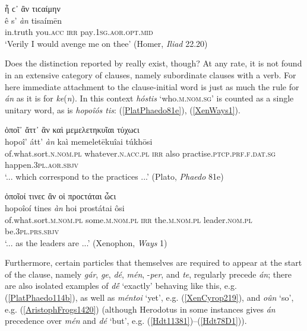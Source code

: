 \begin{exe}
\ex ἦ ϲ᾽ ἂν τιϲαίμην\\
\gll ê s' \emph{àn} tisaímēn\\
in.truth you.\textsc{acc} \textsc{irr} pay\textsc{.1sg.aor.opt.mid}\\
\trans `Verily I would avenge me on thee' (Homer, \textit{Iliad} 22.20)
\label{HomIl2220}
\end{exe}

Does the distinction reported by \citeauthor{Hermann1831} really exist, though? At any rate, it is not found in an extensive category of clauses, namely subordinate clauses with a  verb. For here immediate attachment to the clause-initial word is just as much the rule for \emph{án} as it is for \textit{ke}(\textit{n}). In this context \textit{hóstis} `who.\textsc{m.nom.sg}' is counted as a single unitary word, as is \textit{hopoîós tis}: (\ref{PlatPhaedo81e}), (\ref{XenWays1}).

\begin{exe}
\ex ὁποῖ᾽ ἄττ᾽ ἂν καὶ μεμελετηκυῖαι τύχωϲι\\
\gll hopoî' átt' \emph{àn} kaì memeletēkuîai túkhōsi\\
of.what.sort.\textsc{n.nom.pl} whatever.\textsc{n.acc.pl} \textsc{irr} also
practise.\textsc{ptcp.prf.f.dat.sg} happen.\textsc{3pl.aor.sbjv}\\
\trans `... which correspond to the practices ...' (Plato, \textit{Phaedo} 81e)
\label{PlatPhaedo81e}
\end{exe}

\begin{exe}
\ex ὁποῖοί τινεϲ ἂν οἱ προϲτάται ὦϲι\\
\gll hopoîoí tines \emph{àn} hoi prostátai ôsi\\
of.what.sort.\textsc{m.nom.pl} some.\textsc{m.nom.pl} \textsc{irr}
the.\textsc{m.nom.pl} leader.\textsc{nom.pl} be.\textsc{3pl.prs.sbjv}\\
\trans `... as the leaders are ...' (Xenophon, \textit{Ways} 1)
\label{XenWays1}
\end{exe}

Furthermore, certain particles that themselves are required to appear at the start of the clause, namely \textit{gár}, \textit{ge}, \textit{dé}, \textit{mén}, -\textit{per}, and \textit{te}, regularly precede \emph{án}; there are also isolated examples of \textit{dḗ} `exactly' behaving like this, e.g. (\ref{PlatPhaedo114b}), as well as \emph{méntoi} `yet', e.g. (\ref{XenCyrop219}), and \textit{oûn} `so', e.g. (\ref{AristophFrogs1420}) (although Herodotus in some instances gives \emph{án} precedence over \textit{mén} and \textit{dé} `but', e.g. (\ref{Hdt11381})--(\ref{Hdt78D1})).

